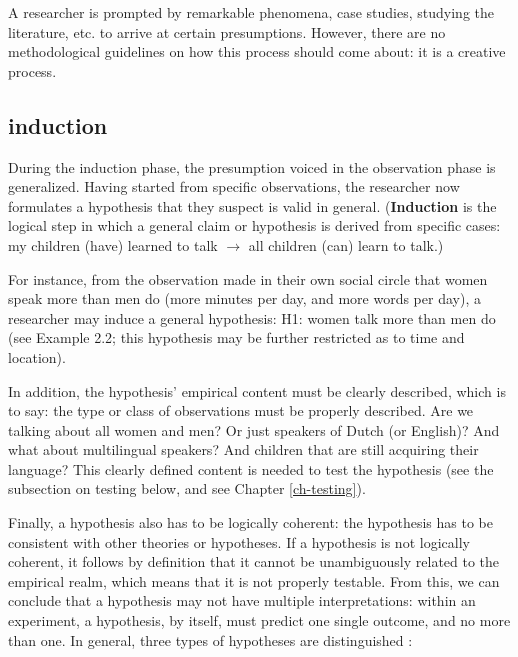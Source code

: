 \documentclass[
]{book}
\begin{document}
A researcher is prompted by remarkable phenomena, case studies, studying the literature, etc. to arrive at certain presumptions. However, there are no methodological guidelines on how this process should come about: it is a creative process.

\subsection{induction}\label{induction}

During the induction phase, the presumption voiced in the observation phase is generalized. Having started from specific observations, the researcher now formulates a hypothesis that they suspect is valid in general. (\textbf{Induction} is the logical step in which a general claim or hypothesis is derived from specific cases: my children (have) learned to talk \(\rightarrow\) all children (can) learn to talk.)

For instance, from the observation made in their own social circle that women speak more than men do (more minutes per day, and more words per day), a researcher may induce a general hypothesis: H1: women talk more than men do (see Example 2.2; this hypothesis may be further restricted as to time and location).

In addition, the hypothesis' empirical content must be clearly described, which is to say: the type or class of observations must be properly described. Are we talking about all women and men? Or just speakers of Dutch (or English)? And what about multilingual speakers? And children that are still acquiring their language? This clearly defined content is needed to test the hypothesis (see the subsection on testing below, and see Chapter \ref{ch-testing}).

Finally, a hypothesis also has to be logically coherent: the hypothesis has to be consistent with other theories or hypotheses. If a hypothesis is not logically coherent, it follows by definition that it cannot be unambiguously related to the empirical realm, which means that it is not properly testable. From this, we can conclude that a hypothesis may not have multiple interpretations: within an experiment, a hypothesis, by itself, must predict one single outcome, and no more than one.
In general, three types of hypotheses are distinguished \citep{Groot61}:
\end{document}
